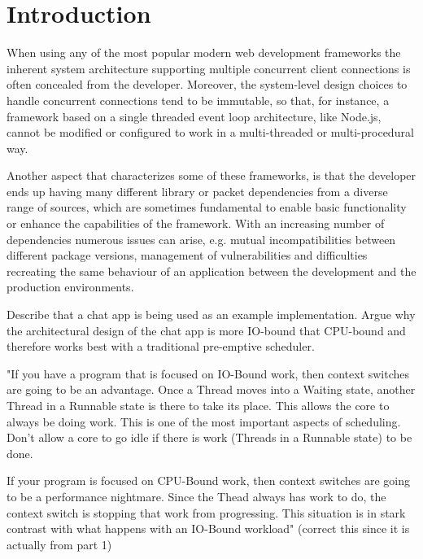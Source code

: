 \section{Introduction}
When using any of the most popular modern web development frameworks the inherent system architecture supporting multiple concurrent client connections is often concealed from the developer. Moreover, the system-level design choices to handle concurrent connections tend to be immutable, so that, for instance, a framework based on a single threaded event loop architecture, like Node.js, cannot be modified or configured to work in a multi-threaded or multi-procedural way. 

Another aspect that characterizes some of these frameworks, is that the developer ends up having many different library or packet dependencies from a diverse range of sources, which are sometimes fundamental to enable basic functionality or enhance the capabilities of the framework. With an increasing number of dependencies numerous issues can arise, e.g. mutual incompatibilities between different package versions, management of vulnerabilities and difficulties recreating the same behaviour of an application between the development and the production environments. 

Describe that a chat app is being used as an example implementation. Argue why the architectural design of the chat app is more IO-bound that CPU-bound \cite{Kennedy2018} and therefore works best with a traditional pre-emptive scheduler.

"If you have a program that is focused on IO-Bound work, then context switches are going to be an advantage. Once a Thread moves into a Waiting state, another Thread in a Runnable state is there to take its place. This allows the core to always be doing work. This is one of the most important aspects of scheduling. Don’t allow a core to go idle if there is work (Threads in a Runnable state) to be done.

If your program is focused on CPU-Bound work, then context switches are going to be a performance nightmare. Since the Thead always has work to do, the context switch is stopping that work from progressing. This situation is in stark contrast with what happens with an IO-Bound workload"\cite{Kennedy2018} (correct this since it is actually from part 1)

